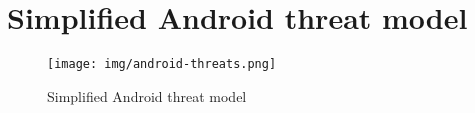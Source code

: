 \onecolumn
\clearpage
\section{Simplified Android threat model}
\label{section:andro-threat}

\begin{figure*}[h!]
\centering
\texttt{[image: img/android-threats.png]}
\caption{Simplified Android threat model}
\label{pic:andro-threat}
\end{figure*}
